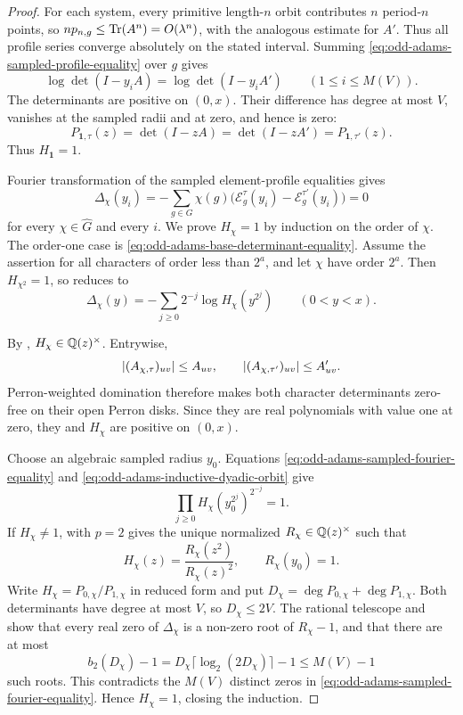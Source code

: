 \begin{proof}
For each system, every primitive length-\(n\) orbit contributes \(n\)
period-\(n\) points, so \(np_{n,g}\le\operatorname{Tr}(A^n)=O(\lambda^n)\), with the
analogous estimate for \(A'\).  Thus all profile series converge absolutely on
the stated interval.  Summing
\eqref{eq:odd-adams-sampled-profile-equality} over \(g\) gives
\[
 \log\det(I-y_iA)=\log\det(I-y_iA')
 \qquad(1\le i\le M(V)).
\]
The determinants are positive on \((0,x)\).  Their difference has degree at
most \(V\), vanishes at the sampled radii and at zero, and hence is zero:
\begin{equation}\label{eq:odd-adams-base-determinant-equality}
 P_{\mathbf1,\tau}(z)=\det(I-zA)=\det(I-zA')
 =P_{\mathbf1,\tau'}(z).
\end{equation}
Thus \(H_{\mathbf1}=1\).

Fourier transformation of the sampled element-profile equalities gives
\begin{equation}\label{eq:odd-adams-sampled-fourier-equality}
 \Delta_\chi(y_i)
 =-\sum_{g\in G}\chi(g)
   \bigl(\mathcal E_g^\tau(y_i)-\mathcal E_g^{\tau'}(y_i)\bigr)
 =0
\end{equation}
for every \(\chi\in\widehat G\) and every \(i\).  We prove
\(H_\chi=1\) by induction on the order of \(\chi\).  The order-one case is
\eqref{eq:odd-adams-base-determinant-equality}.  Assume the assertion for
all characters of order less than \(2^a\), and let \(\chi\) have order
\(2^a\).  Then \(H_{\chi^2}=1\), so
 reduces to
\begin{equation}\label{eq:odd-adams-inductive-dyadic-orbit}
 \Delta_\chi(y)
 =-\sum_{j\ge0}2^{-j}\log H_\chi(y^{2^j})
 \qquad(0<y<x).
\end{equation}

By , \(H_\chi\in\mathbb{Q}(z)^\times\).
Entrywise,
\[
 \lvert (A_{\chi,\tau})_{uv} \rvert\le A_{uv},\qquad
 \lvert (A_{\chi,\tau'})_{uv} \rvert\le A'_{uv}.
\]
Perron-weighted domination therefore makes both character determinants
zero-free on their open Perron disks.  Since they are real polynomials with
value one at zero, they and \(H_\chi\) are positive on \((0,x)\).

Choose an algebraic sampled radius \(y_0\).  Equations
\eqref{eq:odd-adams-sampled-fourier-equality} and
\eqref{eq:odd-adams-inductive-dyadic-orbit} give
\[
 \prod_{j\ge0}H_\chi(y_0^{2^j})^{2^{-j}}=1.
\]
If \(H_\chi\ne1\),  with \(p=2\)
gives the unique normalized \(R_\chi\in\mathbb{Q}(z)^\times\) such that
\[
 H_\chi(z)=\frac{R_\chi(z^2)}{R_\chi(z)^2},\qquad R_\chi(y_0)=1.
\]
Write \(H_\chi=P_{0,\chi}/P_{1,\chi}\) in reduced form and put
\(D_\chi=\deg P_{0,\chi}+\deg P_{1,\chi}\).  Both determinants have degree
at most \(V\), so \(D_\chi\le2V\).  The rational telescope and
 show that every real zero of
\(\Delta_\chi\) is a non-zero root of \(R_\chi-1\), and that there are at
most
\[
 b_2(D_\chi)-1
 =D_\chi\lceil\log_2(2D_\chi)\rceil-1
 \le M(V)-1
\]
such roots.  This contradicts the \(M(V)\) distinct zeros in
\eqref{eq:odd-adams-sampled-fourier-equality}.  Hence \(H_\chi=1\), closing
the induction.


\end{proof}

